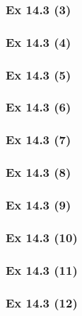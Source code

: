 \subsubsection{Ex 14.3 (3)}\label{sec:Ex_14.3.3}

\subsubsection{Ex 14.3 (4)}\label{sec:Ex_14.3.4}

\subsubsection{Ex 14.3 (5)}\label{sec:Ex_14.3.5}

\subsubsection{Ex 14.3 (6)}\label{sec:Ex_14.3.6}

\subsubsection{Ex 14.3 (7)}\label{sec:Ex_14.3.7}

\subsubsection{Ex 14.3 (8)}\label{sec:Ex_14.3.8}

\subsubsection{Ex 14.3 (9)}\label{sec:Ex_14.3.9}

\subsubsection{Ex 14.3 (10)}\label{sec:Ex_14.3.10}

\newpage		%

\subsubsection{Ex 14.3 (11)}\label{sec:Ex_14.3.11}

\subsubsection{Ex 14.3 (12)}\label{sec:Ex_14.3.12}


